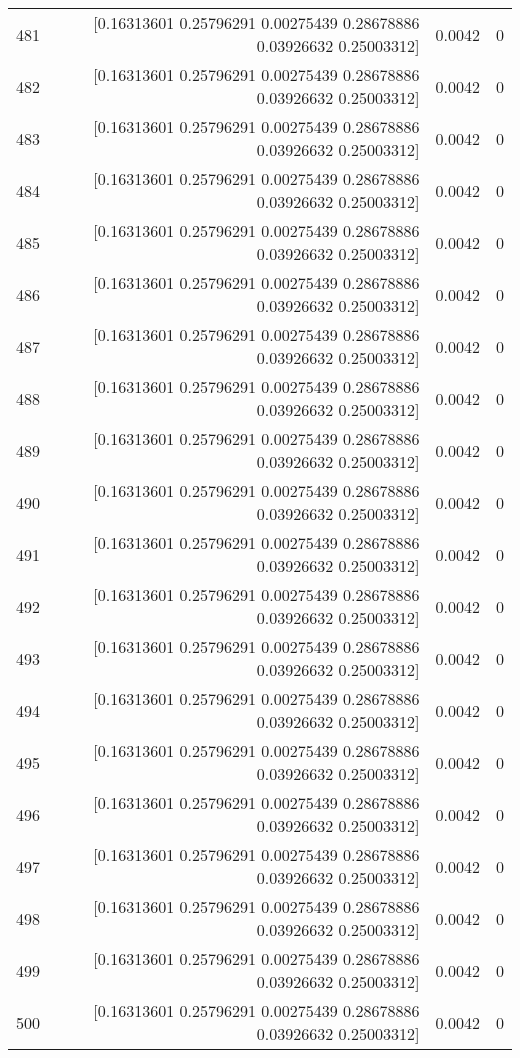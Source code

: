 \begin{longtable}{lrrr}
481 & [0.16313601 0.25796291 0.00275439 0.28678886 0.03926632 0.25003312] & 0.0042 & 0 \\
482 & [0.16313601 0.25796291 0.00275439 0.28678886 0.03926632 0.25003312] & 0.0042 & 0 \\
483 & [0.16313601 0.25796291 0.00275439 0.28678886 0.03926632 0.25003312] & 0.0042 & 0 \\
484 & [0.16313601 0.25796291 0.00275439 0.28678886 0.03926632 0.25003312] & 0.0042 & 0 \\
485 & [0.16313601 0.25796291 0.00275439 0.28678886 0.03926632 0.25003312] & 0.0042 & 0 \\
486 & [0.16313601 0.25796291 0.00275439 0.28678886 0.03926632 0.25003312] & 0.0042 & 0 \\
487 & [0.16313601 0.25796291 0.00275439 0.28678886 0.03926632 0.25003312] & 0.0042 & 0 \\
488 & [0.16313601 0.25796291 0.00275439 0.28678886 0.03926632 0.25003312] & 0.0042 & 0 \\
489 & [0.16313601 0.25796291 0.00275439 0.28678886 0.03926632 0.25003312] & 0.0042 & 0 \\
490 & [0.16313601 0.25796291 0.00275439 0.28678886 0.03926632 0.25003312] & 0.0042 & 0 \\
491 & [0.16313601 0.25796291 0.00275439 0.28678886 0.03926632 0.25003312] & 0.0042 & 0 \\
492 & [0.16313601 0.25796291 0.00275439 0.28678886 0.03926632 0.25003312] & 0.0042 & 0 \\
493 & [0.16313601 0.25796291 0.00275439 0.28678886 0.03926632 0.25003312] & 0.0042 & 0 \\
494 & [0.16313601 0.25796291 0.00275439 0.28678886 0.03926632 0.25003312] & 0.0042 & 0 \\
495 & [0.16313601 0.25796291 0.00275439 0.28678886 0.03926632 0.25003312] & 0.0042 & 0 \\
496 & [0.16313601 0.25796291 0.00275439 0.28678886 0.03926632 0.25003312] & 0.0042 & 0 \\
497 & [0.16313601 0.25796291 0.00275439 0.28678886 0.03926632 0.25003312] & 0.0042 & 0 \\
498 & [0.16313601 0.25796291 0.00275439 0.28678886 0.03926632 0.25003312] & 0.0042 & 0 \\
499 & [0.16313601 0.25796291 0.00275439 0.28678886 0.03926632 0.25003312] & 0.0042 & 0 \\
500 & [0.16313601 0.25796291 0.00275439 0.28678886 0.03926632 0.25003312] & 0.0042 & 0 \\
\end{longtable}